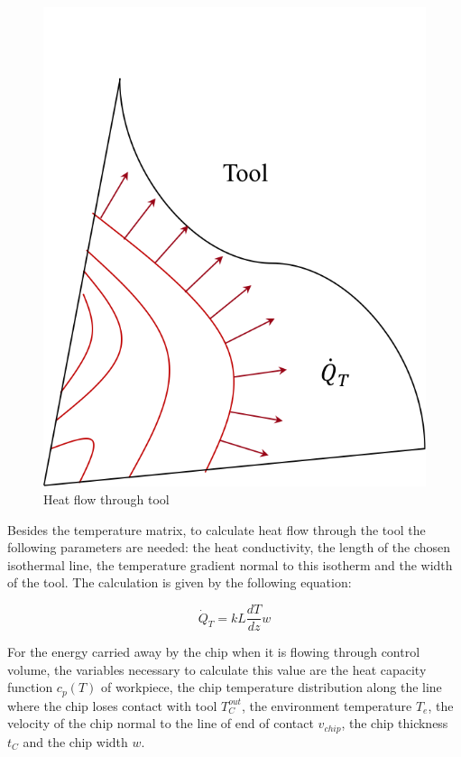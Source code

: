 			\begin{figure}[H]
				\centering
				\captionsetup{justification=centering}
				\includegraphics[scale=0.6]{Cap4/ToolHeat.png}
				\caption{Heat flow through tool}
				\label{fig:heattool}
			\end{figure}

			Besides the temperature matrix, to calculate heat flow through the tool the following parameters are needed: the heat conductivity, the length of the chosen isothermal line, the temperature gradient normal to this isotherm and the width of the tool. The calculation is given by the following equation:

			\begin{equation} 
			\label{eq_heattool}
				\dot{Q}_{T} = kL\frac{dT}{dz}w
			\end{equation}

			For the energy carried away by the chip when it is flowing through control volume, the variables necessary to calculate this value are the heat capacity function $c_{p}(T)$ of workpiece, the chip temperature distribution along the line where the chip loses contact with tool $T_{C}^{out}$, the environment temperature $T_{e}$, the velocity of the chip normal to the line of end of contact $v_{chip}$, the chip thickness $t_{C}$ and the chip width $w$.


